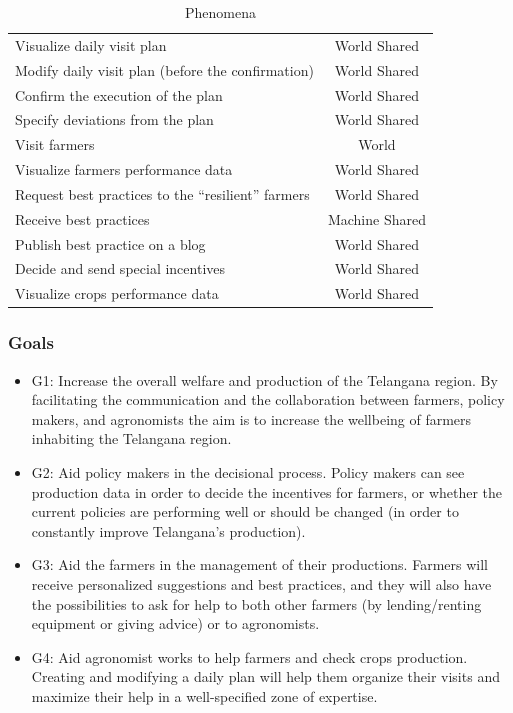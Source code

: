 \documentclass{article}
\begin{document}
\begin{table}[h]
\begin{tabular}{l|c}
            Visualize daily visit plan & World Shared \\
            Modify daily visit plan (before the confirmation) & World Shared \\
            Confirm the execution of the plan & World Shared \\
            Specify deviations from the plan & World Shared \\
            Visit farmers & World \\
        \hline
            Visualize farmers performance data & World Shared \\
            Request best practices to the “resilient” farmers & World Shared \\
            Receive best practices & Machine Shared \\
            Publish best practice on a blog & World Shared \\
            Decide and send special incentives & World Shared \\
            Visualize crops performance data & World Shared \\
    
        \end{tabular}
        \caption{Phenomena}
    \end{table}


\subsubsection{Goals}
    \begin{itemize}
        \item G1: Increase the overall welfare and production of the Telangana region.
        By facilitating the communication and the collaboration between farmers, policy makers, and agronomists the aim is to increase the wellbeing of farmers inhabiting the Telangana region.
        \item G2: Aid policy makers in the decisional process.
        Policy makers can see production data in order to decide the incentives for farmers, or whether the current policies are performing well or should be changed (in order to constantly improve Telangana’s production).
        \item G3: Aid the farmers in the management of their productions.
        Farmers will receive personalized suggestions and best practices, and they will also have the possibilities to ask for help to both other farmers (by lending/renting equipment or giving advice) or to agronomists.
        \item G4: Aid agronomist works to help farmers and check crops production.
        Creating and modifying a daily plan will help them organize their visits and maximize their help in a well-specified zone of expertise.
    \end{itemize}
\end{document}
